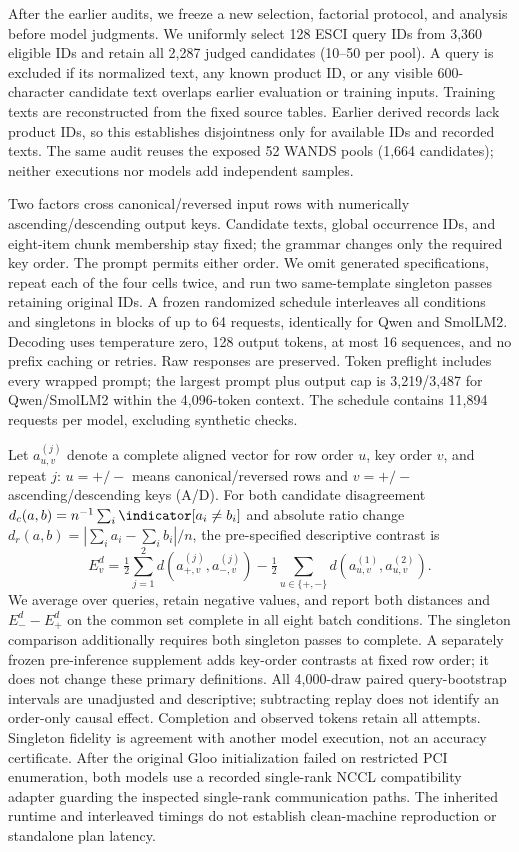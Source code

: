 After the earlier audits, we freeze a new selection, factorial protocol, and analysis before model judgments. We uniformly select 128 ESCI query IDs from 3,360 eligible IDs and retain all 2,287 judged candidates (10--50 per pool). A query is excluded if its normalized text, any known product ID, or any visible 600-character candidate text overlaps earlier evaluation or training inputs. Training texts are reconstructed from the fixed source tables. Earlier derived records lack product IDs, so this establishes disjointness only for available IDs and recorded texts. The same audit reuses the exposed 52 WANDS pools (1,664 candidates); neither executions nor models add independent samples.

Two factors cross canonical/reversed input rows with numerically ascending/descending output keys. Candidate texts, global occurrence IDs, and eight-item chunk membership stay fixed; the grammar changes only the required key order. The prompt permits either order. We omit generated specifications, repeat each of the four cells twice, and run two same-template singleton passes retaining original IDs. A frozen randomized schedule interleaves all conditions and singletons in blocks of up to 64 requests, identically for Qwen and SmolLM2. Decoding uses temperature zero, 128 output tokens, at most 16 sequences, and no prefix caching or retries. Raw responses are preserved. Token preflight includes every wrapped prompt; the largest prompt plus output cap is 3,219/3,487 for Qwen/SmolLM2 within the 4,096-token context. The schedule contains 11,894 requests per model, excluding synthetic checks.

Let $a_{u,v}^{(j)}$ denote a complete aligned vector for row order $u$, key order $v$, and repeat $j$: $u=+/-$ means canonical/reversed rows and $v=+/-$ ascending/descending keys (A/D). For both candidate disagreement $d_c(a,b)=n^{-1}\sum_i\indicator[a_i\ne b_i]$ and absolute ratio change $d_r(a,b)=|\sum_i a_i-\sum_i b_i|/n$, the pre-specified descriptive contrast is
\begin{equation}
E_v^d=\tfrac12\sum_{j=1}^2 d(a_{+,v}^{(j)},a_{-,v}^{(j)})
-\tfrac12\sum_{u\in\{+,-\}}d(a_{u,v}^{(1)},a_{u,v}^{(2)}).
\label{eq:excess}
\end{equation}
We average over queries, retain negative values, and report both distances and $E_-^d-E_+^d$ on the common set complete in all eight batch conditions. The singleton comparison additionally requires both singleton passes to complete. A separately frozen pre-inference supplement adds key-order contrasts at fixed row order; it does not change these primary definitions. All 4,000-draw paired query-bootstrap intervals are unadjusted and descriptive; subtracting replay does not identify an order-only causal effect. Completion and observed tokens retain all attempts. Singleton fidelity is agreement with another model execution, not an accuracy certificate. After the original Gloo initialization failed on restricted PCI enumeration, both models use a recorded single-rank NCCL compatibility adapter guarding the inspected single-rank communication paths. The inherited runtime and interleaved timings do not establish clean-machine reproduction or standalone plan latency.
